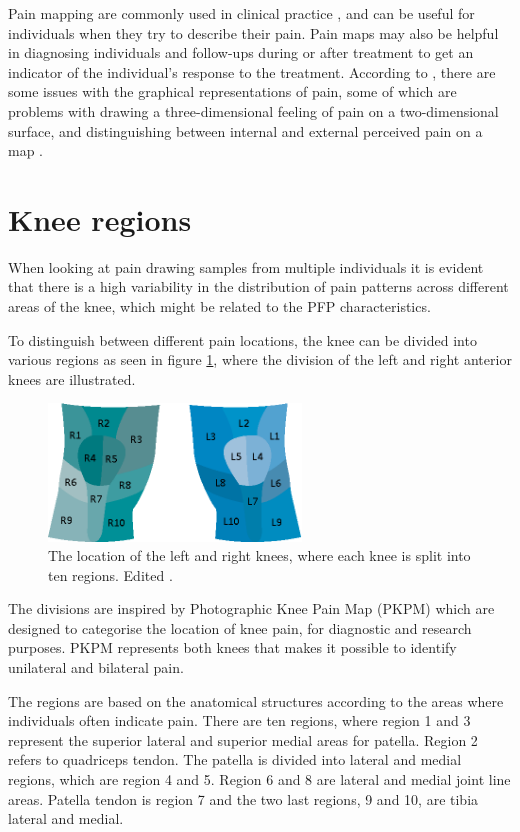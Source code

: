\noindent
Pain mapping are commonly used in clinical practice \citep{Schott2010}, and can be useful for individuals when they try to describe their pain. Pain maps may also be helpful in diagnosing individuals and follow-ups during or after treatment to get an indicator of the individual's response to the treatment.\citep{Boudreau2016}
According to \citeauthor{Schott2010}, there are some issues with the graphical representations of pain, some of which are problems with drawing a three-dimensional feeling of pain on a two-dimensional surface, and distinguishing between internal and external perceived pain on a map \citep{Schott2010}.

\section{Knee regions}
When looking at pain drawing samples from multiple individuals it is evident that there is a high variability in the distribution of pain patterns across different areas of the knee, which might be related to the PFP characteristics.

\noindent
To distinguish between different pain locations, the knee can be divided into various regions as seen in figure \ref{fig:atlas}, where the division of the left and right anterior knees are illustrated. 

\begin{figure} [H] 
\centering
\includegraphics[width=0.6\textwidth]{figures/atlas}
\caption{The location of the left and right knees, where each knee is split into ten regions. Edited \citep{Elson2010}.}
\label{fig:atlas}
\end{figure}

\noindent
The divisions are inspired by Photographic Knee Pain Map (PKPM) which are designed to categorise the location of knee pain, for diagnostic and research purposes. PKPM represents both knees that makes it possible to identify unilateral and bilateral pain.\citep{Elson2010}

\noindent
The regions are based on the anatomical structures according to the areas where individuals often indicate pain.
There are ten regions, where region 1 and 3 represent the superior lateral and superior medial areas for patella. Region 2 refers to quadriceps tendon. The patella is divided into lateral and medial regions, which are region 4 and 5. Region 6 and 8 are lateral and medial joint line areas. Patella tendon is region 7 and the two last regions, 9 and 10, are tibia lateral and medial.\citep{Elson2010}

\newpage
